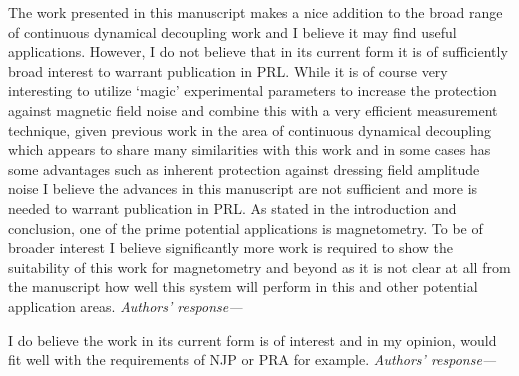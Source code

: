 \documentclass[letterpaper]{article}
\newenvironment{refcomment}{\singlespacing\verbatim}{\endverbatim}
\newcommand{\response}{\emph{Authors' response---}}
\begin{document}
\begin{refcomment}
The work presented in this manuscript makes a nice addition to the 
broad range of continuous dynamical decoupling work and I believe it 
may find useful applications. However, I do not believe that in its 
current form it is of sufficiently broad interest to warrant 
publication in PRL. While it is of course very interesting to utilize 
‘magic’ experimental parameters to increase the protection against
magnetic field noise and combine this with a very efficient 
measurement technique, given previous work in the area of continuous 
dynamical decoupling which appears to share many similarities with
this work and in some cases has some advantages such as inherent 
protection against dressing field amplitude noise I believe the 
advances in this manuscript are not sufficient and more is needed to
warrant publication in PRL. As stated in the introduction and 
conclusion, one of the prime potential applications is magnetometry. 
To be of broader interest I believe significantly more work is 
required to show the suitability of this work for magnetometry and 
beyond as it is not clear at all from the manuscript how well this 
system will perform in this and other potential application areas.
\end{refcomment}
\response


\begin{refcomment}
I do believe the work in its current form is of interest and in my 
opinion, would fit well with the requirements of NJP or PRA for 
example.
\end{refcomment}
\response 
\end{document}
